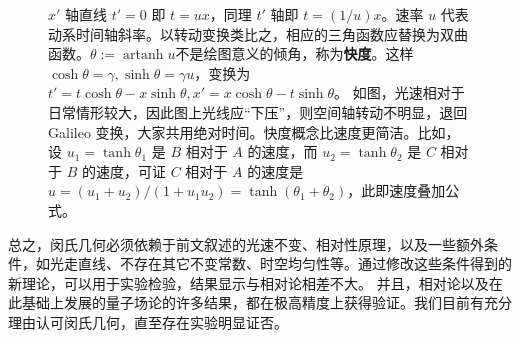 \begin{figure}[p]
    \caption{\small
    $x'$ 轴直线 $t'=0$ 即 $t=u x$，同理 $t'$ 轴即 $t=(1 / u) x$。速率 $u$ 代表动系时间轴斜率。以转动变换类比之，相应的三角函数应替换为双曲函数。$\theta:=\operatorname{artanh}u$不是绘图意义的倾角，称为\textbf{快度}。这样 $\cosh\theta=\gamma,  \sinh\theta=\gamma u$，变换为 $t'= t\cosh\theta - x\sinh\theta, x'= x\cosh\theta -t \sinh\theta$。
    如图，光速相对于日常情形较大，因此图上光线应“下压”，则空间轴转动不明显，退回 Galileo 变换，大家共用绝对时间。快度概念比速度更简洁。比如，设 $u_1=\tanh\theta_{1}$ 是 $B$ 相对于 $A$ 的速度，而 $u_2=\tanh\theta_{2}$ 是 $C$ 相对于 $B$ 的速度，可证 $C$ 相对于 $A$ 的速度是 $u={(u_{1}+u_{2})}/{(1+u_{1} u_{2})}=\tanh(\theta_1+\theta_{2})$，此即速度叠加公式。
    }\label{fig:boost}
\end{figure}

总之，闵氏几何必须依赖于前文叙述的光速不变、相对性原理，以及一些额外条件，如光走直线、不存在其它不变常数、时空均匀性等。通过修改这些条件得到的新理论，可以用于实验检验，结果显示与相对论相差不大。
并且，相对论以及在此基础上发展的量子场论的许多结果，都在极高精度上获得验证。我们目前有充分理由认可闵氏几何，直至存在实验明显证否。

